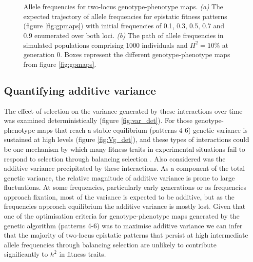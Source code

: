 \begin{figure}
\begin{center}
 \\
 \\
\caption[Allele frequency trajectories for epistasis under selection]{Allele frequencies for two-locus genotype-phenotype maps. \emph{(a)} The expected trajectory of allele frequencies for epistatic fitness patterns (figure \ref{fig:gpmaps}) with initial frequencies of 0.1, 0.3, 0.5, 0.7 and 0.9 enumerated over both loci. \emph{(b)} The path of allele frequencies in simulated populations comprising 1000 individuals and $H^2=10\%$ at generation 0. Boxes represent the different genotype-phenotype maps from figure \ref{fig:gpmaps}.}
\label{fig:allelefreq}
\end{center}
\end{figure}

\subsection{Quantifying additive variance}

The effect of selection on the variance generated by these interactions over time was examined deterministically (figure \ref{fig:var_det}). For those genotype-phenotype maps that reach a stable equilibrium (patterns 4-6) genetic variance is sustained at high levels (figure \ref{fig:Vg_det}), and these types of interactions could be one mechanism by which many fitness traits in experimental situations fail to respond to selection through balancing selection \citep{Hansen2004}. Also considered was the additive variance precipitated by these interactions. As a component of the total genetic variance, the relative magnitude of additive variance is prone to large fluctuations. At some frequencies, particularly early generations or as frequencies approach fixation, most of the variance is expected to be additive, but as the frequencies approach equilibrium the additive variance is mostly lost. Given that one of the optimisation criteria for genotype-phenotype maps generated by the genetic algorithm (patterns 4-6) was to maximise additive variance we can infer that the majority of two-locus epistatic patterns that persist at high intermediate allele frequencies through balancing selection are unlikely to contribute significantly to $h^2$ in fitness traits.

